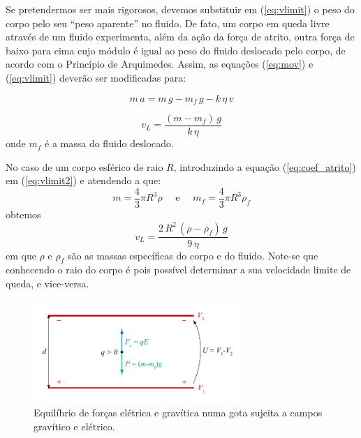 \documentclass[a4paper,twoside,12pt]{article}      %
\begin{document}

    Se pretendermos ser mais rigorosos, devemos substituir  em (\ref{eq:vlimit}) o peso do corpo pelo seu “peso aparente” no fluido. De fato, um corpo em queda livre através de um fluido experimenta, além da ação da força de atrito, outra força de baixo para cima cujo módulo é igual ao peso do fluido deslocado pelo corpo, de acordo com o Princípio de Arquimedes. Assim, as equações (\ref{eq:mov}) e (\ref{eq:vlimit}) deverão ser modificadas para:

    \begin{equation}
        \label{eq:mov2}
        m\,a = m\,g - m_f\,g  - k  \, \eta \, v
    \end{equation}


    \begin{equation}
        \label{eq:vlimit2}
        v_L = \frac{(m - m_f)\,g}{k  \, \eta}
    \end{equation}
    onde $m_f$ é a massa do fluido deslocado.

    No caso de um corpo esférico de raio $R$, introduzindo a equação (\ref{eq:coef_atrito}) em (\ref{eq:vlimit2}) e atendendo a que:
    \begin{equation*}
        m = \frac{4}{3} \pi R^3 \rho \quad \textrm{  e } \quad  m_f = \frac{4}{3} \pi R^3 \rho_f
    \end{equation*}
    obtemos
    \begin{equation}
        \label{eq:vlimit3}
        v_L = \frac{2\,R^2\, (\rho - \rho_f)\,g}{9  \, \eta}
    \end{equation}
    em que $\rho$  e $\rho_f$ são as massas específicas do corpo e do fluido. Note-se que conhecendo o raio do corpo é pois possível determinar  a sua velocidade limite de queda, e vice-versa.



\begin{figure}
    [tb]  \centering 
    \includegraphics[width=0.7\textwidth]{./F_equil}
    \caption{Equilíbrio de forças elétrica e gravítica numa gota sujeita a campos gravítico e elétrico. \label{fig:f_equil}} 
\end{figure}
\end{document}
